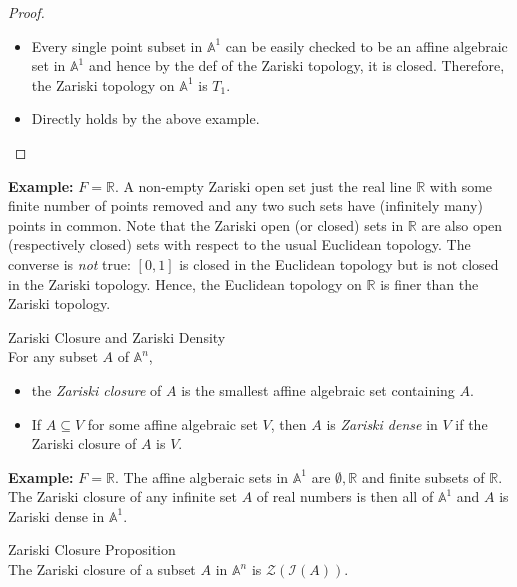 \begin{proof}
    \begin{itemize}
        \item Every single point subset in $\mathbb{A}^1$ can be easily checked to be an affine algebraic set in $\mathbb{A}^1$ and hence by the def of the Zariski topology, it is closed. Therefore, the Zariski topology on $\mathbb{A}^1$ is $T_1$.

        \item Directly holds by the above example.
    \end{itemize}
\end{proof}

\noindent\textbf{Example:} $F= \mathbb{R}$. A non-empty Zariski open set just the real line $\mathbb{R}$ with some finite number of points removed and any two such sets have (infinitely many) points in common. Note that the Zariski open (or closed) sets in $\mathbb{R}$ are also open (respectively closed) sets with respect to the usual Euclidean topology. The converse is \textit{not} true: $[0,1]$ is closed in the Euclidean topology but is not closed in the Zariski topology. Hence, the Euclidean topology on $\mathbb{R}$ is finer than the Zariski topology.

\begin{definition}{Zariski Closure and Zariski Density}\\
For any subset $A$ of $\mathbb{A}^n$,
\begin{itemize}
    \item the \textit{Zariski closure} of $A$ is the smallest affine algebraic set containing $A$.
    \item If $A \subseteq V$ for some affine algebraic set $V$, then $A$ is \textit{Zariski dense} in $V$ if the Zariski closure of $A$ is $V$.
\end{itemize}
\end{definition}

\noindent\textbf{Example:} $F=\mathbb{R}$. The affine algberaic sets in $\mathbb{A}^1$ are $\emptyset,\mathbb{R}$ and finite subsets of $\mathbb{R}$. The Zariski closure of any infinite set $A$ of real numbers is then all of $\mathbb{A}^1$ and $A$ is Zariski dense in $\mathbb{A}^1$.


\begin{proposition}{Zariski Closure Proposition}\\
The Zariski closure of a subset $A$ in $\mathbb{A}^n$ is $\mathcal{Z} (\mathcal{I} (A))$.
\end{proposition}

